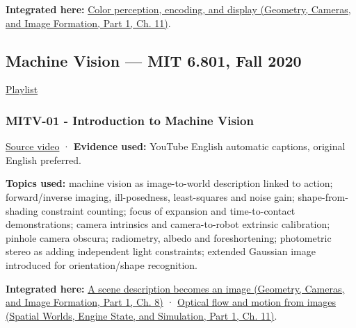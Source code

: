\textbf{Integrated here:} \href{../03-Geometry-Cameras-and-Image-Formation-P01/main.pdf\#03-visual-computing-i-ch004-color-perception-encoding-and-display}{Color perception, encoding, and display (Geometry, Cameras, and Image Formation, Part 1, Ch. 11)}.

\subsection{Machine Vision --- MIT 6.801, Fall 2020}\label{04-visual-computing-ii-ch036-machine-vision-mit-6.801-fall-2020}

\hypertarget{04-visual-computing-ii-ch036-machine-vision-mit-6.801-fall-2020}{}

\href{https://www.youtube.com/playlist?list=PLUl4u3cNGP63pfpS1gV5P9tDxxL_e4W8O}{Playlist}

\subsubsection{MITV-01 - Introduction to Machine Vision}\label{04-visual-computing-ii-ch036-mitv-01---introduction-to-machine-vision}

\hypertarget{04-visual-computing-ii-ch036-mitv-01---introduction-to-machine-vision}{}

\href{https://www.youtube.com/watch?v=tY2gczObpfU}{Source video} · \textbf{Evidence used:} YouTube English automatic captions, original English preferred.

\textbf{Topics used:} machine vision as image-to-world description linked to action; forward/inverse imaging, ill-posedness, least-squares and noise gain; shape-from-shading constraint counting; focus of expansion and time-to-contact demonstrations; camera intrinsics and camera-to-robot extrinsic calibration; pinhole camera obscura; radiometry, albedo and foreshortening; photometric stereo as adding independent light constraints; extended Gaussian image introduced for orientation/shape recognition.

\textbf{Integrated here:} \href{../03-Geometry-Cameras-and-Image-Formation-P01/main.pdf\#03-visual-computing-i-ch001-a-scene-description-becomes-an-image}{A scene description becomes an image (Geometry, Cameras, and Image Formation, Part 1, Ch. 8)} · \href{../05-Spatial-Worlds-Engine-State-and-Simulation-P01/main.pdf\#04-visual-computing-ii-ch030-optical-flow-and-motion-from-images}{Optical flow and motion from images (Spatial Worlds, Engine State, and Simulation, Part 1, Ch. 11)}.

